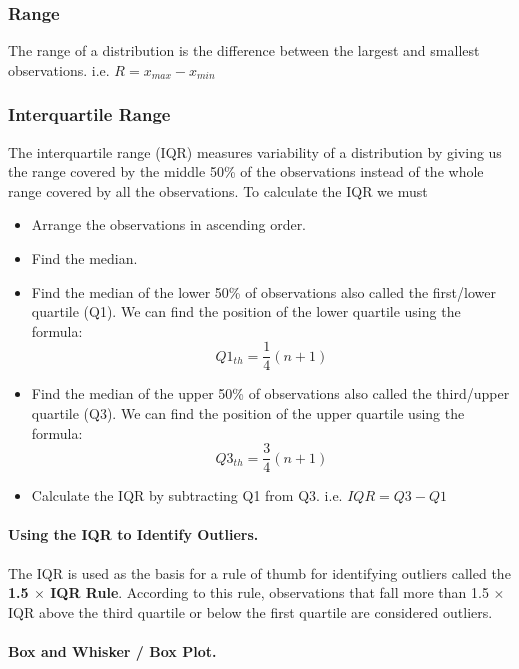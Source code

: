\documentclass[12pt letter]{report}
\begin{document}
\subsubsection{Range}

The range of a distribution is the difference between the largest and smallest observations. i.e. $R = x_{max} - x_{min}$

\subsubsection{Interquartile Range}

The interquartile range (IQR) measures variability of a distribution by giving us the range covered by the middle 50\% of the
observations instead of the whole range covered by all the observations. To calculate the IQR we must

\begin{itemize}
	\item Arrange the observations in ascending order.
	\item Find the median.
	\item Find the median of the lower 50\% of observations also called the first/lower quartile (Q1). We can find the
	      position of the lower quartile using the formula:
	      \[
		      Q1_{th} = \frac{1}{4}(n + 1)
	      \]
	\item Find the median of the upper 50\% of observations also called the third/upper quartile (Q3). We can find the
	      position of the upper quartile using the formula:
	      \[
		      Q3_{th} = \frac{3}{4}(n + 1)
	      \]
	\item Calculate the IQR by subtracting Q1 from Q3. i.e. $IQR = Q3 - Q1$
\end{itemize}


\paragraph{Using the IQR to Identify Outliers.}

The IQR is used as the basis for a rule of thumb for identifying outliers called the \textbf{1.5 $\times$ IQR Rule}. According to this rule, observations that fall more than 1.5 $\times$ IQR above the third quartile or below the first quartile are considered outliers.


\paragraph{Box and Whisker / Box Plot.}
\end{document}
